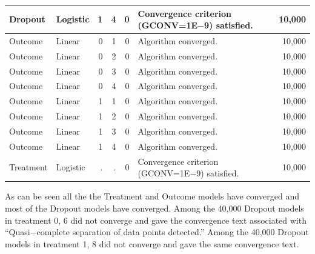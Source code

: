\documentclass[10pt]{article}
\begin{document}
\begin{minipage}{\textwidth}
\begin{flushleft}
\begin{minipage}[l]{5.6in}
{\begin{tabular}{|l|l|r|r|r|l|r|}
   Dropout &    Logistic &    1 &    4 &            0 &    Convergence criterion (GCONV=1E$-$9) satisfied. &       10,000\\\hline
   Outcome &    Linear &    0 &    1 &            0 &    Algorithm converged. &       10,000\\\hline
   Outcome &    Linear &    0 &    2 &            0 &    Algorithm converged. &       10,000\\\hline
   Outcome &    Linear &    0 &    3 &            0 &    Algorithm converged. &       10,000\\\hline
   Outcome &    Linear &    0 &    4 &            0 &    Algorithm converged. &       10,000\\\hline
   Outcome &    Linear &    1 &    1 &            0 &    Algorithm converged. &       10,000\\\hline
   Outcome &    Linear &    1 &    2 &            0 &    Algorithm converged. &       10,000\\\hline
   Outcome &    Linear &    1 &    3 &            0 &    Algorithm converged. &       10,000\\\hline
   Outcome &    Linear &    1 &    4 &            0 &    Algorithm converged. &       10,000\\\hline
   Treatment &    Logistic &    . &    . &            0 &    Convergence criterion (GCONV=1E$-$9) satisfied. &       10,000\\\hline
\end{tabular}}
\end{minipage}
\end{flushleft}
\end{minipage}
\vspace{0.2in}

As can be seen all the the Treatment and Outcome models have converged and most of the Dropout models have converged.  Among the 40,000 Dropout models in treatment 0, 6 did not converge and gave the convergence text associated with ``Quasi$-$complete separation of data points detected.''  Among the 40,000 Dropout models in treatment 1, 8 did not converge and gave the same convergence text.
\end{document}
